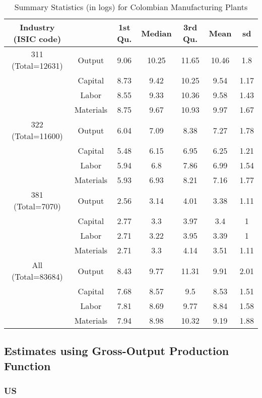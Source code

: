 \documentclass[11pt]{article}
\begin{document}
\begin{table}[H]
\centering
\caption{Summary Statistics (in logs) for Colombian Manufacturing Plants}
\begin{tabular}{ccccccc}
  \hline\hline Industry (ISIC code) &   & 1st Qu. & Median & 3rd Qu. & Mean & sd \\ 
  \hline
311 (Total=12631) & Output & 9.06 & 10.25 & 11.65 & 10.46 & 1.8 \\ 
   & Capital & 8.73 & 9.42 & 10.25 & 9.54 & 1.17 \\ 
   & Labor & 8.55 & 9.33 & 10.36 & 9.58 & 1.43 \\ 
   & Materials & 8.75 & 9.67 & 10.93 & 9.97 & 1.67 \\ 
  322 (Total=11600) & Output & 6.04 & 7.09 & 8.38 & 7.27 & 1.78 \\ 
   & Capital & 5.48 & 6.15 & 6.95 & 6.25 & 1.21 \\ 
   & Labor & 5.94 & 6.8 & 7.86 & 6.99 & 1.54 \\ 
   & Materials & 5.93 & 6.93 & 8.21 & 7.16 & 1.77 \\ 
  381 (Total=7070) & Output & 2.56 & 3.14 & 4.01 & 3.38 & 1.11 \\ 
   & Capital & 2.77 & 3.3 & 3.97 & 3.4 & 1 \\ 
   & Labor & 2.71 & 3.22 & 3.95 & 3.39 & 1 \\ 
   & Materials & 2.71 & 3.3 & 4.14 & 3.51 & 1.11 \\ 
  All (Total=83684) & Output & 8.43 & 9.77 & 11.31 & 9.91 & 2.01 \\ 
   & Capital & 7.68 & 8.57 & 9.5 & 8.53 & 1.51 \\ 
   & Labor & 7.81 & 8.69 & 9.77 & 8.84 & 1.58 \\ 
   & Materials & 7.94 & 8.98 & 10.32 & 9.19 & 1.88 \\ 
   \hline
\end{tabular}
\label{COLsum}
\end{table}

\subsection{Estimates using Gross-Output Production Function}

\subsubsection{US}
\end{document}
